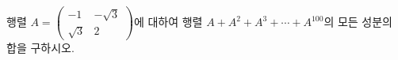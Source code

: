 행렬 $A=\begin{pmatrix} -1 & -\sqrt{3} \\ \sqrt{3} & 2 \end{pmatrix}$에 대하여 행렬 $A+A^2+A^3+\cdots+A^{100}$의 모든 성분의 합을 구하시오.

